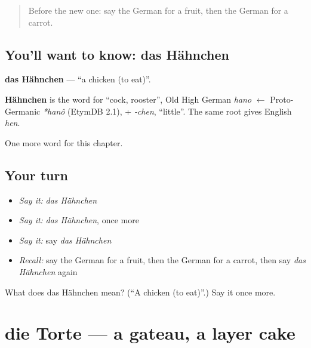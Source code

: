 \label{lesson:GE-C199-haehnchen}



\begin{quote}
Before the new one: say the German for a fruit, then the German for a carrot.
\end{quote}

\subsection*{You'll want to know: das Hähnchen}
\textbf{das Hähnchen} — \textquotedblleft{}a chicken (to eat)\textquotedblright{}.

\begin{cousinweb}
\textbf{Hähnchen} is the word for \textquotedblleft{}cock, rooster\textquotedblright{}, Old High German \emph{hano} $\leftarrow$ Proto-Germanic \emph{*hanô} (EtymDB 2.1), + \emph{-chen}, \textquotedblleft{}little\textquotedblright{}. The same root gives English \emph{hen}.
\end{cousinweb}

\begin{grammarlens}[title={What you've built}]
One more word for this chapter.
\end{grammarlens}

\subsection*{Your turn}
\begin{itemize}
\raggedright
  \item \emph{Say it:} \emph{das Hähnchen}
  \item \emph{Say it:} \emph{das Hähnchen}, once more
  \item \emph{Say it:} say \emph{das Hähnchen}
  \item \emph{Recall:} say the German for a fruit, then the German for a carrot, then say \emph{das Hähnchen} again
\end{itemize}

\begin{tcolorbox}[breakable,colback=teal!4,colframe=teal!35!black,title={Before you move on}]
What does das Hähnchen mean? (\textquotedblleft{}A chicken (to eat)\textquotedblright{}.) Say it once more.
\end{tcolorbox}
\section[die Torte]{die Torte — a gateau, a layer cake}

